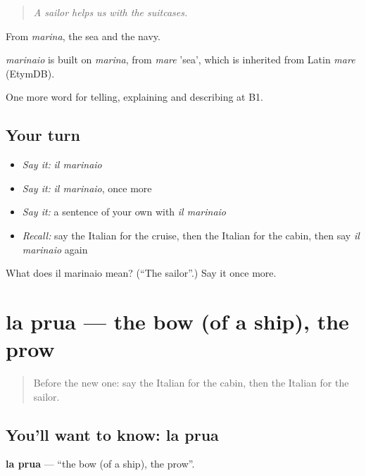 \begin{quote}
\emph{A sailor helps us with the suitcases.}
\end{quote}

From \emph{marina}, the sea and the navy.

\begin{cousinweb}
\emph{marinaio} is built on \emph{marina}, from \emph{mare} 'sea', which is inherited from Latin \emph{mare} (EtymDB).
\end{cousinweb}

\begin{grammarlens}[title={What you've built}]
One more word for telling, explaining and describing at B1.
\end{grammarlens}

\subsection*{Your turn}
\begin{itemize}
\raggedright
  \item \emph{Say it:} \emph{il marinaio}
  \item \emph{Say it:} \emph{il marinaio}, once more
  \item \emph{Say it:} a sentence of your own with \emph{il marinaio}
  \item \emph{Recall:} say the Italian for the cruise, then the Italian for the cabin, then say \emph{il marinaio} again
\end{itemize}

\begin{tcolorbox}[breakable,colback=teal!4,colframe=teal!35!black,title={Before you move on}]
What does il marinaio mean? (\textquotedblleft{}The sailor\textquotedblright{}.) Say it once more.
\end{tcolorbox}
\section[la prua]{la prua — the bow (of a ship), the prow}

\label{lesson:IT-C423-prua}



\begin{quote}
Before the new one: say the Italian for the cabin, then the Italian for the sailor.
\end{quote}

\subsection*{You'll want to know: la prua}
\textbf{la prua} — \textquotedblleft{}the bow (of a ship), the prow\textquotedblright{}.

